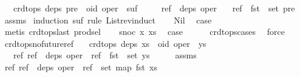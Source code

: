 \begin{isabellebody}
\ \ \ {\isachardoublequoteopen}crdt{\isacharunderscore}ops\ deps\ {\isacharparenleft}pre\ {\isacharat}\ {\isacharparenleft}oid{\isacharcomma}\ oper{\isacharparenright}\ {\isacharhash}\ suf{\isacharparenright}{\isachardoublequoteclose}\isanewline
\ \ \ \ \ {\isachardoublequoteopen}ref\ {\isasymin}\ deps\ oper{\isachardoublequoteclose}\isanewline
\ \ \ {\isachardoublequoteopen}ref\ {\isasymin}\ fst\ {\isacharbackquote}\ set\ pre{\isachardoublequoteclose}\isanewline
%
\isadelimproof
%
\endisadelimproof
%
\isatagproof
{}\isamarkupfalse%
\ assms\ \isamarkupfalse%
{\isacharparenleft}induction\ suf\ rule{\isacharcolon}\ List{\isachardot}rev{\isacharunderscore}induct{\isacharparenright}\isanewline
\ \ \isamarkupfalse%
\ Nil\ \isamarkupfalse%
\ {\isacharquery}case\isanewline
\ \ \ \ \isamarkupfalse%
\ {\isacharparenleft}metis\ crdt{\isacharunderscore}ops{\isacharunderscore}last\ prod{\isachardot}sel{\isacharparenleft}{}{\isacharparenright}{\isacharparenright}\isanewline
{}\isamarkupfalse%
\isanewline
\ \ \isamarkupfalse%
\ {\isacharparenleft}snoc\ x\ xs{\isacharparenright}\ \isamarkupfalse%
\ {\isacharquery}case\isanewline
\ \ \ \ \isamarkupfalse%
\ crdt{\isacharunderscore}ops{\isachardot}cases\ \isamarkupfalse%
\ force\isanewline
{}\isamarkupfalse%
%
\endisatagproof
{\isafoldproof}%
%
\isadelimproof
\isanewline
%
\endisadelimproof
\isanewline
{}\isamarkupfalse%
\ crdt{\isacharunderscore}ops{\isacharunderscore}no{\isacharunderscore}future{\isacharunderscore}ref{\isacharcolon}\isanewline
\ \ \ {\isachardoublequoteopen}crdt{\isacharunderscore}ops\ deps\ {\isacharparenleft}xs\ {\isacharat}\ {\isacharbrackleft}{\isacharparenleft}oid{\isacharcomma}\ oper{\isacharparenright}{\isacharbrackright}\ {\isacharat}\ ys{\isacharparenright}{\isachardoublequoteclose}\isanewline
\ \ \ {\isachardoublequoteopen}{\isasymAnd}ref{\isachardot}\ ref\ {\isasymin}\ deps\ oper\ {\isasymLongrightarrow}\ ref\ {\isasymnotin}\ fst\ {\isacharbackquote}\ set\ ys{\isachardoublequoteclose}\isanewline
%
\isadelimproof
%
\endisadelimproof
%
\isatagproof
{}\isamarkupfalse%
\ {\isacharminus}\isanewline
\ \ \isamarkupfalse%
\ assms{\isacharparenleft}{}{\isacharparenright}\ \isamarkupfalse%
\ {\isachardoublequoteopen}{\isasymAnd}ref{\isachardot}\ ref\ {\isasymin}\ deps\ oper\ {\isasymLongrightarrow}\ ref\ {\isasymin}\ set\ {\isacharparenleft}map\ fst\ xs{\isacharparenright}{\isachardoublequoteclose}\isanewline

\end{isabellebody}
